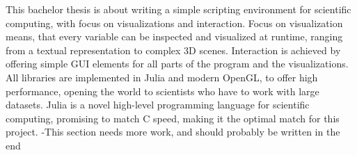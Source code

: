 This bachelor thesis is about writing a simple scripting environment for scientific computing, with focus on visualizations and interaction.
Focus on visualization means, that every variable can be inspected and visualized at runtime, ranging from a textual representation to complex 3D scenes.
Interaction is achieved by offering simple GUI elements for all parts of the program and the visualizations.
All libraries are implemented in Julia and modern OpenGL, to offer high performance, opening the world to scientists who have to work with large datasets.
Julia is a novel high-level programming language for scientific computing, promising to match C speed, making it the optimal match for this project.
-This section needs more work, and should probably be written in the end